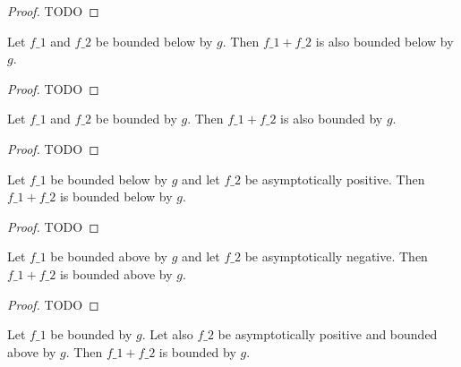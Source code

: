 \begin{proof}
    \leanok
    TODO
\end{proof}

\begin{lemma}
    \label{lemma:asymp_bounded_below_add}
    \leanok
    Let $f\_1$ and $f\_2$ be bounded below by $g$. Then $f\_1 + f\_2$ is also bounded 
    below by $g$.
\end{lemma}

\begin{proof}
    \leanok
    TODO
\end{proof}

\begin{lemma}
    \label{lemma:asymp_bounded_add}
    \leanok
    Let $f\_1$ and $f\_2$ be bounded by $g$. Then $f\_1 + f\_2$ is also bounded by $g$.
\end{lemma}

\begin{proof}
    \leanok
    TODO
\end{proof}

\begin{lemma}
    \label{lemma:asymp_bounded_below_add_pos}
    \leanok
    Let $f\_1$ be bounded below by $g$ and let $f\_2$ be asymptotically positive. 
    Then $f\_1 + f\_2$ is bounded below by $g$.
\end{lemma}

\begin{proof}
    \leanok
    TODO
\end{proof}

\begin{lemma}
    \label{lemma:asymp_bounded_above_add_neg}
    \leanok
    Let $f\_1$ be bounded above by $g$ and let $f\_2$ be asymptotically negative. 
    Then $f\_1 + f\_2$ is bounded above by $g$.
\end{lemma}

\begin{proof}
    \leanok
    TODO
\end{proof}

\begin{lemma}
    \label{lemma:asymp_bounded_add_pos_above}
    \leanok
    Let $f\_1$ be bounded by $g$. Let also $f\_2$ be asymptotically positive and
    bounded above by $g$. Then $f\_1 + f\_2$ is bounded by $g$.
\end{lemma}

